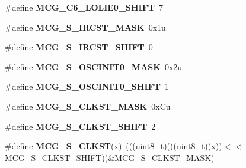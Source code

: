 \begin{DoxyCompactItemize}
\item 
\#define {\bfseries M\+C\+G\+\_\+\+C6\+\_\+\+L\+O\+L\+I\+E0\+\_\+\+S\+H\+I\+FT}~7\hypertarget{group__MCG__Register__Masks_gaf62eb94fa38802a5950bd616b539a69c}{}\label{group__MCG__Register__Masks_gaf62eb94fa38802a5950bd616b539a69c}

\item 
\#define {\bfseries M\+C\+G\+\_\+\+S\+\_\+\+I\+R\+C\+S\+T\+\_\+\+M\+A\+SK}~0x1u\hypertarget{group__MCG__Register__Masks_ga1c693472984fb69650b117ffe5b76da5}{}\label{group__MCG__Register__Masks_ga1c693472984fb69650b117ffe5b76da5}

\item 
\#define {\bfseries M\+C\+G\+\_\+\+S\+\_\+\+I\+R\+C\+S\+T\+\_\+\+S\+H\+I\+FT}~0\hypertarget{group__MCG__Register__Masks_ga9abb1ad8f00a085572bb58ab815b7afd}{}\label{group__MCG__Register__Masks_ga9abb1ad8f00a085572bb58ab815b7afd}

\item 
\#define {\bfseries M\+C\+G\+\_\+\+S\+\_\+\+O\+S\+C\+I\+N\+I\+T0\+\_\+\+M\+A\+SK}~0x2u\hypertarget{group__MCG__Register__Masks_ga75a97c37fbe3689889ea81fd04f13805}{}\label{group__MCG__Register__Masks_ga75a97c37fbe3689889ea81fd04f13805}

\item 
\#define {\bfseries M\+C\+G\+\_\+\+S\+\_\+\+O\+S\+C\+I\+N\+I\+T0\+\_\+\+S\+H\+I\+FT}~1\hypertarget{group__MCG__Register__Masks_ga3680bc3a628991bb5279d9d6b938b374}{}\label{group__MCG__Register__Masks_ga3680bc3a628991bb5279d9d6b938b374}

\item 
\#define {\bfseries M\+C\+G\+\_\+\+S\+\_\+\+C\+L\+K\+S\+T\+\_\+\+M\+A\+SK}~0x\+Cu\hypertarget{group__MCG__Register__Masks_gaf43507c78cdda211a04b5ae0509edb2e}{}\label{group__MCG__Register__Masks_gaf43507c78cdda211a04b5ae0509edb2e}

\item 
\#define {\bfseries M\+C\+G\+\_\+\+S\+\_\+\+C\+L\+K\+S\+T\+\_\+\+S\+H\+I\+FT}~2\hypertarget{group__MCG__Register__Masks_gab0768a667adb2dc2e1fb7972f9fd85a4}{}\label{group__MCG__Register__Masks_gab0768a667adb2dc2e1fb7972f9fd85a4}

\item 
\#define {\bfseries M\+C\+G\+\_\+\+S\+\_\+\+C\+L\+K\+ST}(x)~(((uint8\+\_\+t)(((uint8\+\_\+t)(x))$<$$<$M\+C\+G\+\_\+\+S\+\_\+\+C\+L\+K\+S\+T\+\_\+\+S\+H\+I\+FT))\&M\+C\+G\+\_\+\+S\+\_\+\+C\+L\+K\+S\+T\+\_\+\+M\+A\+SK)\hypertarget{group__MCG__Register__Masks_ga891e8f2d733bebc7ab21cf49e0473b24}{}\label{group__MCG__Register__Masks_ga891e8f2d733bebc7ab21cf49e0473b24}


\end{DoxyCompactItemize}
